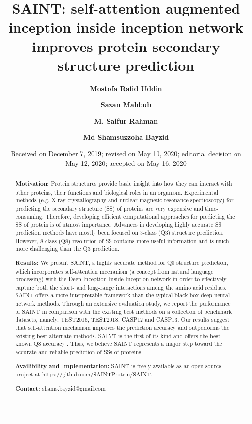 \documentclass[11 pt, a4paper]{article}
\title{\textbf{SAINT: self-attention augmented inception
inside inception network improves protein secondary structure
prediction}}
\author[1,2,\footnote{The authors wish it to be known that,
in their opinion, the first two authors should be regarded as
Joint First Authors.\newline Associate Editor: Arne Elofsson}]
{\textbf{Mostofa Rafid Uddin}}
\author[1,*]{\textbf{Sazan Mahbub}}
\author[1]{\textbf{M. Saifur Rahman}}
\author[1,\footnote{To whom correspondence should be
addressed.\newline Associate Editor: Arne Elofsson}]
{\textbf{Md Shamsuzzoha Bayzid}}
\affil[1]{\small{Department of Computer Science and
Engineering, Bangladesh University of Engineering and
Technology, Dhaka 1205, Bangladesh}}
\affil[2]{\small{Department of Computer Science and
Engineering, East West University, Dhaka 1212, Bangladesh}}
\date{\small{Received on December 7, 2019; revised on May 10,
2020; editorial decision on May 12, 2020; accepted on May 16,
2020}}
\begin{document}
\maketitle

\begin{abstract}
\textbf{Motivation:} Protein structures provide basic insight
into how they can interact with other proteins, their
functions and biological roles in an organism. Experimental
methods (e.g. X-ray crystallography and nuclear magnetic
resonance spectroscopy) for predicting the secondary 
structure (SS) of proteins are very expensive and time-
consuming. Therefore, developing efficient computational 
approaches for predicting the SS of protein is of utmost
importance. Advances in developing highly accurate SS
prediction methods have mostly been focused on 3-class (Q3)
structure prediction. However, 8-class (Q8) resolution of SS
contains more useful information and is much more challenging
than the Q3 prediction. \par
\textbf{Results:} We present SAINT, a highly accurate method
for Q8 structure prediction, which incorporates self-attention
mechanism (a concept from natural language processing) with 
the Deep Inception-Inside-Inception network in order
to effectively capture both the short- and long-range 
interactions among the amino acid residues. SAINT offers a
more interpretable framework than the typical black-box deep 
neural network methods. Through an extensive evaluation 
study, we report the performance of SAINT in comparison with 
the existing best methods on a collection of
benchmark datasets, namely, TEST2016, TEST2018, CASP12 and
CASP13. Our results suggest that self-attention
mechanism improves the prediction accuracy and outperforms
the existing best alternate methods. SAINT is the
first of its kind and offers the best known Q8 accuracy
. Thus, we believe SAINT represents a major step toward the
accurate and reliable prediction of SSs of proteins.\par
\textbf{Availibility and Implementation:} SAINT is freely 
available as an open-source project at 
\href{https://github.com/SAINTProtein/SAINT}
{https://github.com/SAINTProtein/SAINT}.\par
\textbf{Contact: } \href{https://gmail/shams.bayzid@gmail.com}
{shams.bayzid@gmail.com}
\end{abstract}
\par\noindent\rule{\textwidth}{2pt}
\end{document}
